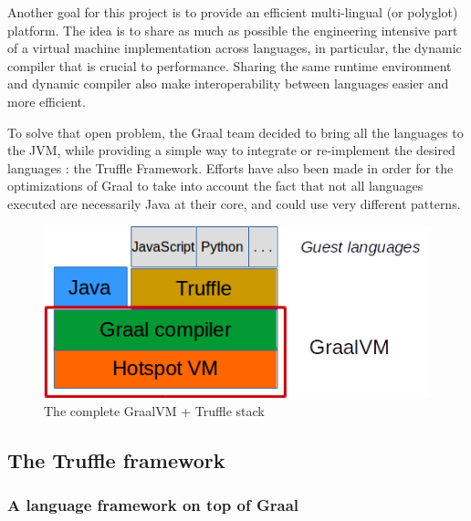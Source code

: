 \documentclass[twoside,11pt,a4paper]{article}
\begin{document}
Another goal for this project is to provide an efficient multi-lingual (or polyglot) platform. The idea is to share as much as possible the engineering intensive part of a virtual machine implementation across languages, in particular, the dynamic compiler that is crucial to performance.  Sharing the same runtime environment and dynamic compiler also make interoperability between languages easier  and more efficient. 

To solve that open problem, the Graal team decided to bring all the languages to the JVM, while providing a simple way to integrate or re-implement the desired languages : the Truffle Framework. Efforts have also been made in order for the optimizations of Graal to take into account the fact that not all languages executed are necessarily Java at their core, and could use very different patterns.

\begin{figure}
	\centering
	\hspace*{2cm}
	\includegraphics[scale=0.7]{./graphs/GraalVMStack.png}
	\caption{The complete GraalVM + Truffle stack}
	\label{fig:graalvmstack}
\end{figure}

\subsection{The Truffle framework}

\subsubsection{A language framework on top of Graal}
\end{document}
